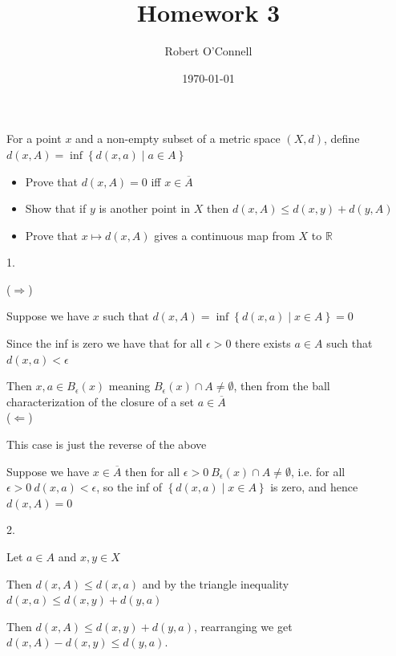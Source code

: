 \documentclass{article}
\title{\textbf{Homework 3}}
\author{Robert O'Connell}
\date{\today}
\begin{document}
\maketitle

\begin{problem}
For a point \( x \) and a non-empty subset of a metric space \( (X,d) \), define \( d(x,A) = \inf\left\{ d(x,a) \mid a \in A \right\}  \)
\begin{itemize}
	\item Prove that \( d(x,A) = 0 \) iff \( x \in \overline{A} \)
	\item Show that if \( y \) is another point in \( X \) then \( d(x,A) \le d(x,y) + d(y,A) \)
	\item Prove that \( x \mapsto d(x,A) \) gives a continuous map from \( X \) to \( \mathbb{R} \)
\end{itemize}

\begin{solution} 1.

	(\( \Rightarrow \))

	Suppose we have \( x \) such that \( d(x,A) = \inf\left\{ d(x,a) \mid x \in A \right\} = 0 \)

	Since the inf is zero we have that for all \( \epsilon > 0 \) there exists \( a \in A \) such that \( d(x,a) < \epsilon \)

	Then \(x,a \in B_{\epsilon}(x) \) meaning \( B_{\epsilon}(x) \cap A \neq \emptyset \), then from the ball characterization of the closure of a set \( a \in \overline{A} \)
	\\

	(\( \Leftarrow \))

	This case is just the reverse of the above

	Suppose we have \( x \in \overline{A} \) then for all \( \epsilon > 0 \ B_{\epsilon}(x) \cap A \neq \emptyset \), i.e. for all \( \epsilon > 0 \ d(x,a) < \epsilon \), so the inf of \( \left\{ d(x,a) \mid x \in A \right\}  \) is zero, and hence \( d(x,A) = 0 \)

\end{solution}

\begin{solution} 2.

	Let \( a \in A \) and \( x,y \in X \)

	Then \( d(x,A) \le d(x,a) \) and by the triangle inequality \( d(x,a) \le d(x,y) + d(y,a) \)

	Then \( d(x,A) \le d(x,y) + d(y,a) \), rearranging we get \( d(x,A) - d(x,y) \le d(y,a) \).


\end{solution}
\end{problem}
\end{document}
